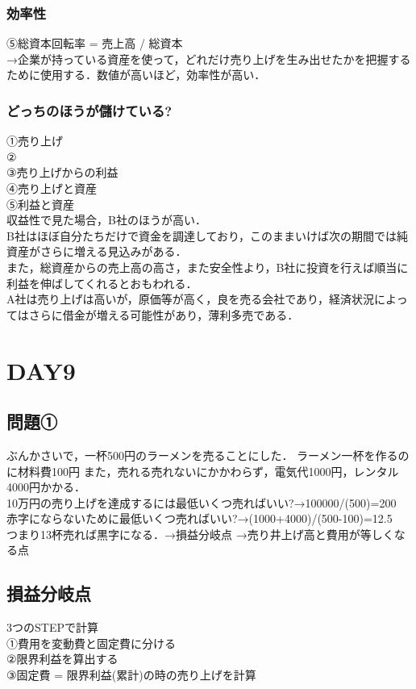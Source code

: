 \documentclass[a4paper,11pt]{ltjsarticle}
\begin{document}
\subsubsection{効率性}
⑤総資本回転率 = 売上高 / 総資本\\
→企業が持っている資産を使って，どれだけ売り上げを生み出せたかを把握するために使用する．数値が高いほど，効率性が高い．
\subsubsection{どっちのほうが儲けている?}
①売り上げ\\
②\\
③売り上げからの利益\\
④売り上げと資産\\
⑤利益と資産\\

収益性で見た場合，B社のほうが高い．\\
B社はほぼ自分たちだけで資金を調達しており，このままいけば次の期間では純資産がさらに増える見込みがある．\\
また，総資産からの売上高の高さ，また安全性より，B社に投資を行えば順当に利益を伸ばしてくれるとおもわれる．\\
A社は売り上げは高いが，原価等が高く，良を売る会社であり，経済状況によってはさらに借金が増える可能性があり，薄利多売である．\\
\section{DAY9}
\subsection{問題①}
ぶんかさいで，一杯500円のラーメンを売ることにした．
ラーメン一杯を作るのに材料費100円
また，売れる売れないにかかわらず，電気代1000円，レンタル4000円かかる．\\
10万円の売り上げを達成するには最低いくつ売ればいい?→100000/(500)=200\\
赤字にならないために最低いくつ売ればいい?→(1000+4000)/(500-100)=12.5\\
つまり13杯売れば黒字になる．→損益分岐点
→売り井上げ高と費用が等しくなる点
\subsection{損益分岐点}
3つのSTEPで計算\\
①費用を変動費と固定費に分ける\\
②限界利益を算出する\\
③固定費 = 限界利益(累計)の時の売り上げを計算
\end{document}

